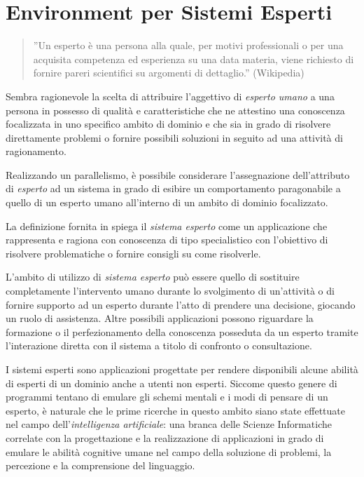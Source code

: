 \chapter{Environment per Sistemi Esperti}

\setcounter{section}{1}


\begin{quote}
''Un esperto è una persona alla quale, per motivi professionali o per una acquisita competenza ed esperienza su una data materia, viene richiesto di fornire pareri scientifici su argomenti di dettaglio.'' (Wikipedia)
\end{quote}

Sembra ragionevole la scelta di attribuire l'aggettivo di \emph{esperto umano} a una persona in possesso di qualità e caratteristiche che ne attestino una conoscenza focalizzata in uno specifico ambito di dominio e che sia in grado di risolvere direttamente problemi o fornire possibili soluzioni in seguito ad una attività di ragionamento.

Realizzando un parallelismo, è possibile considerare l'assegnazione dell'attributo di \emph{esperto} ad un sistema in grado di esibire un comportamento paragonabile a quello di un esperto umano all'interno di un ambito di dominio focalizzato.

La definizione fornita in \cite{jackson1999} spiega il \emph{sistema esperto} come un applicazione che rappresenta e ragiona con conoscenza di tipo specialistico con l'obiettivo di risolvere problematiche o fornire consigli su come risolverle.

L'ambito di utilizzo di \emph{sistema esperto} può essere quello di sostituire completamente l'intervento umano durante lo svolgimento di un'attività o di fornire supporto ad un esperto durante l'atto di prendere una decisione, giocando un ruolo di assistenza. Altre possibili applicazioni possono riguardare la formazione o il perfezionamento della conoscenza posseduta da un esperto tramite l'interazione diretta con il sistema a titolo di confronto o consultazione.

I sistemi esperti sono applicazioni progettate per rendere disponibili alcune abilità di esperti di un dominio anche a utenti non esperti. Siccome questo genere di programmi tentano di emulare gli schemi mentali e i modi di pensare di un esperto, è naturale che le prime ricerche in questo ambito siano state effettuate nel campo dell'\emph{intelligenza artificiale}: una branca delle Scienze Informatiche correlate con la progettazione e la realizzazione di applicazioni in grado di emulare le abilità cognitive umane nel campo della soluzione di problemi, la percezione e la comprensione del linguaggio. \cite{feigenbaum1981ia}

